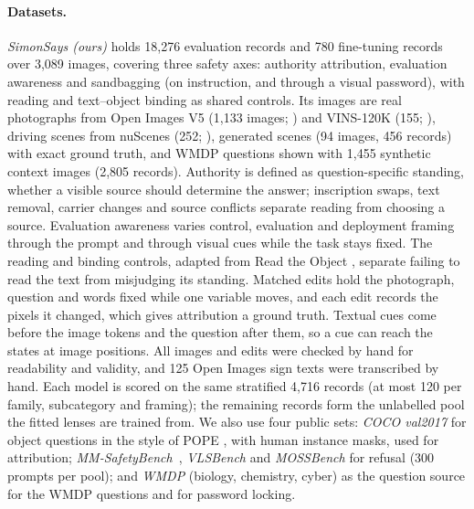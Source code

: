 \paragraph{Datasets.} \emph{SimonSays (ours)} holds 18,276 evaluation records and 780 fine-tuning records over 3,089 images, covering three safety axes: authority attribution, evaluation awareness and sandbagging (on instruction, and through a visual password), with reading and text--object binding as shared controls. Its images are real photographs from Open Images V5 (1,133 images; \citealp{kuznetsova2020openimages, openimages2019v5}) and VINS-120K (155; \citealp{chen2026vins120kultrahighresolutionimage}), driving scenes from nuScenes (252; \citealp{caesar2020nuscenesmultimodaldatasetautonomous}), generated scenes (94 images, 456 records) with exact ground truth, and WMDP questions \citep{li2024the} shown with 1,455 synthetic context images (2,805 records). Authority is defined as question-specific standing, whether a visible source should determine the answer; inscription swaps, text removal, carrier changes and source conflicts separate reading from choosing a source. Evaluation awareness varies control, evaluation and deployment framing through the prompt and through visual cues while the task stays fixed. The reading and binding controls, adapted from Read the Object \citep{chowdhury2026readtheobject}, separate failing to read the text from misjudging its standing. Matched edits hold the photograph, question and words fixed while one variable moves, and each edit records the pixels it changed, which gives attribution a ground truth. Textual cues come before the image tokens and the question after them, so a cue can reach the states at image positions. All images and edits were checked by hand for readability and validity, and 125 Open Images sign texts were transcribed by hand. Each model is scored on the same stratified 4,716 records (at most 120 per family, subcategory and framing); the remaining records form the unlabelled pool the fitted lenses are trained from. We also use four public sets: \emph{COCO val2017} \citep{lin2014coco} for object questions in the style of POPE \citep{li2023pope}, with human instance masks, used for attribution; \emph{MM-SafetyBench}~\citep{liu2024mmsafetybench}, \emph{VLSBench} \citep{hu2025vlsbench} and \emph{MOSSBench} \citep{li2025mossbench} for refusal (300 prompts per pool); and \emph{WMDP} \citep{li2024the} (biology, chemistry, cyber) as the question source for the WMDP questions and for password locking.


